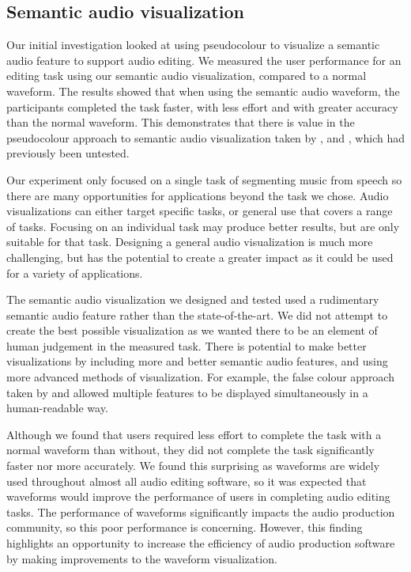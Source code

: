 \subsection{Semantic audio visualization}

Our initial investigation looked at using pseudocolour to visualize a semantic audio feature to support audio editing.
We measured the user performance for an editing task using our semantic audio visualization, compared to a normal
waveform.  The results showed that when using the semantic audio waveform, the participants completed the task faster,
with less effort and with greater accuracy than the normal waveform. This demonstrates that there is value in the
pseudocolour approach to semantic audio visualization taken by \citet{Rice2005}, \citet{Akkermans2011} and
\citet{Loviscach2011a}, which had previously been untested.

Our experiment only focused on a single task of segmenting music from speech so there are many opportunities for
applications beyond the task we chose. Audio visualizations can either target specific tasks, or
general use that covers a range of tasks. Focusing on an individual task may produce better results, but are only suitable
for that task.  Designing a general audio visualization is much more challenging, but has the potential to create a 
greater impact as it could be used for a variety of applications.

The semantic audio visualization we designed and tested used a rudimentary semantic audio feature rather than the
state-of-the-art.  We did not attempt to create the best possible visualization as we wanted there to be an element of
human judgement in the measured task. There is potential to make better visualizations by including more and
better semantic audio features, and using more advanced methods of visualization. For example, the false colour
approach taken by \citet{Tzanetakis2000} and \citet{Mason2007} allowed multiple features to be displayed simultaneously
in a human-readable way.

Although we found that users required less effort to complete the task with a normal waveform than without, they did
not complete the task significantly faster nor more accurately. We found this surprising as waveforms are widely used
throughout almost all audio editing software, so it was expected that waveforms would improve the performance of users in
completing audio editing tasks. The performance of waveforms significantly impacts the audio production community, so
this poor performance is concerning. However, this finding highlights an opportunity to increase the efficiency of
audio production software by making improvements to the waveform visualization.

